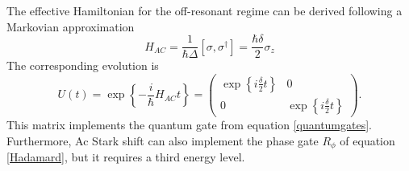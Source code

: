 The effective Hamiltonian for the off-resonant regime can be derived following a Markovian approximation \cite{acstarkhamiltonian}
\begin{equation}
H_{AC} = \frac{1}{\hbar \Delta} [\sigma,\sigma^\dagger] = \frac{\hbar \delta}{2}\sigma_z
\end{equation}
The corresponding evolution is
\begin{equation}
\label{acstarkrotation}
U(t) = \exp\left\{-\frac{i}{\hbar} H_{AC} t \right\} =
 \begin{pmatrix}
   \exp\left\{i\frac{\delta}{2}t\right\} & 0\\
   0 & \exp\left\{i\frac{\delta}{2}t\right\}
\end{pmatrix}.
\end{equation}
This matrix implements the quantum gate from equation \eqref{quantumgates}. Furthermore, Ac Stark shift can also implement the phase gate $R_{\phi}$ of equation \eqref{Hadamard}, but it requires a third energy level.
